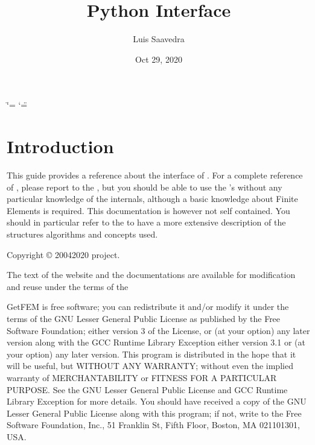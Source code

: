 \documentclass[a4paper,11pt,english]{sphinxmanual}
\title{Python Interface}
\date{Oct 29, 2020}
\author{Luis Saavedra}
\begin{document}
\ifdefined\shorthandoff
  \ifnum\catcode`\=\string=\active\shorthandoff{=}\fi
  \ifnum\catcode`\"=\active{}\fi
\fi

\pagestyle{empty}
\sphinxmaketitle
\pagestyle{plain}
\sphinxtableofcontents
\pagestyle{normal}
\label{\detokenize{python/index::doc}}



\chapter{Introduction}
\label{\detokenize{python/intro:introduction}}\label{\detokenize{python/intro:py-intro}}\label{\detokenize{python/intro::doc}}
This guide provides a reference about the  interface of . For a complete
reference of , please report to the , but you should be able
to use the ’s without any particular knowledge of the  internals,
although a basic knowledge about Finite Elements is required. This documentation
is however not self contained. You should in
particular refer to the  to have a more extensive
description of the structures algorithms and concepts used.

Copyright © 2004\sphinxhyphen{}2020  project.

The text of the  website and the documentations are available for modification and reuse under the terms of the 

GetFEM  is  free software;  you  can  redistribute  it  and/or modify it
under  the  terms  of the  GNU  Lesser General Public License as published
by  the  Free Software Foundation;  either version 3 of the License,  or
(at your option) any later version along with the GCC Runtime Library
Exception either version 3.1 or (at your option) any later version.
This program  is  distributed  in  the  hope  that it will be useful,  but
WITHOUT ANY WARRANTY; without even the implied warranty of MERCHANTABILITY
or  FITNESS  FOR  A PARTICULAR PURPOSE.  See the GNU Lesser General Public
License and GCC Runtime Library Exception for more details.
You  should  have received a copy of the GNU Lesser General Public License
along  with  this program;  if not, write to the Free Software Foundation,
Inc., 51 Franklin St, Fifth Floor, Boston, MA  02110\sphinxhyphen{}1301, USA.
\end{document}
